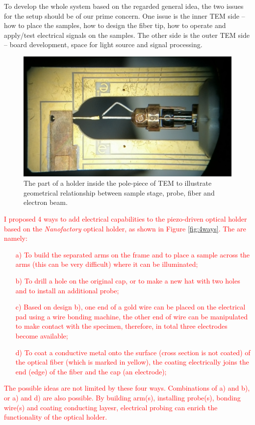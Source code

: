 To develop the whole system based on the regarded general idea, the two issues for the setup should be of our prime concern. One issue is the inner TEM side – how to place the samples, how to design the fiber tip, how to operate and apply/test electrical signals on the samples. The other side is the outer TEM side – board development, space for light source and signal processing.  

\begin{figure}  
\centering
\includegraphics[width=\textwidth]{figures/figure2_holderframe}
\caption[Inner part of the holder]{The part of a holder inside the pole-piece of TEM to illustrate geometrical relationship between sample stage, probe, fiber and electron beam.
\label{fig:2_frame}}
\end{figure}

\textcolor{red}{
I proposed 4 ways to add electrical capabilities to the piezo-driven optical holder based on the \textit{Nanofactory} optical holder, as shown in Figure \ref{fig:4ways}. 
The are namely: \\
\begin{itemize}
	\item[a)] To build the separated arms on the frame and to place a sample across the arms (this can be very difficult) where it can be illuminated; 
	\item[b)] To drill a hole on the original cap, or to make a new hat with two holes and to install an additional probe; 
	\item[c)] Based on design b), one end of a gold wire can be placed on the electrical pad using a wire bonding machine, the other end of wire can be manipulated to make contact with the specimen, therefore, in total three electrodes become available; 
	\item[d)] To coat a conductive metal onto the surface (cross section is not coated) of the optical fiber (which is marked in yellow), the coating electrically joins the end (edge) of the fiber and the cap (an electrode); 
\end{itemize}
The possible ideas are not limited by these four ways. Combinations of a) and b), or a) and d) are also possible. By building arm(s), installing probe(s), bonding wire(s) and coating conducting layesr, electrical probing can enrich the functionality of the optical holder. 
}

